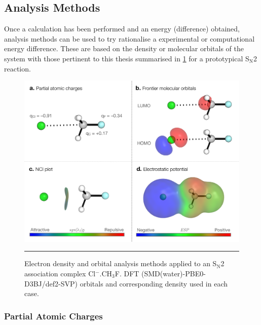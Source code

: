 \documentclass[main.tex]{subfiles}
\begin{document}

\subsection{Analysis Methods}

Once a calculation has been performed and an energy (difference) obtained, analysis methods can be used to try rationalise a experimental or computational energy difference. These are based on the density or molecular orbitals of the system with those pertinent to this thesis summarised in \figurename{ \ref{fig::intro_analysis_methods}} for a prototypical S$_\text{N}$2 reaction. 


\begin{figure}[h!]
	\centering
	\includegraphics[width=\textwidth]{2/figs/fig2/analysis.pdf}
	\vspace{0.1cm}
	\hrule
	\caption{Electron density and orbital analysis methods applied to an S$_\text{N}$2 association complex Cl${}^{-}$.CH${}_3$F. DFT (SMD(water)-PBE0-D3BJ/def2-SVP) orbitals and corresponding density used in each case.}
	\label{fig::intro_analysis_methods}
\end{figure}


\subsubsection{Partial Atomic Charges}
\end{document}
